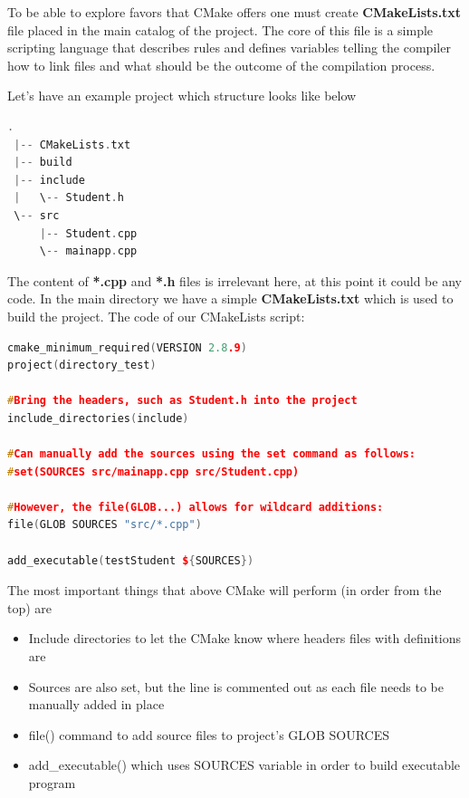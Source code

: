 \documentclass[a4paper,12pt]{article}
\begin{document}
{{\bigskip
To be able to explore favors that CMake offers one must create \textbf{CMakeLists.txt} file placed in the main catalog of the project. The core of this file is a simple scripting language that describes rules and defines variables telling the compiler how to link files and what should be the outcome of the compilation process.

\bigskip
Let's have an example project\cite{cmakeintroduction} which structure looks like below\newline
\begin{lstlisting}[frame=single, language=C++, caption={Example CMake project structure}, captionpos=b]
 .
 |-- CMakeLists.txt
 |-- build
 |-- include
 |   \-- Student.h
 \-- src
     |-- Student.cpp
     \-- mainapp.cpp
\end{lstlisting}

\bigskip
The content of \textbf{*.cpp} and \textbf{*.h} files is irrelevant here, at this point it could be any code. In the main directory we have a simple \textbf{CMakeLists.txt} which is used to build the project. The code of our CMakeLists script:\newline

\begin{lstlisting}[frame=single, language=C++, caption={CMakeLists.txt of example project}, captionpos=b]
cmake_minimum_required(VERSION 2.8.9)
project(directory_test)

#Bring the headers, such as Student.h into the project
include_directories(include)

#Can manually add the sources using the set command as follows:
#set(SOURCES src/mainapp.cpp src/Student.cpp)

#However, the file(GLOB...) allows for wildcard additions:
file(GLOB SOURCES "src/*.cpp")

add_executable(testStudent ${SOURCES})
\end{lstlisting}
\bigskip
The most important things that above CMake will perform (in order from the top) are
\begin{itemize}
	\item Include directories to let the CMake know where headers files with definitions are
	\item Sources are also set, but the line is commented out as each file needs to be manually added in place
	\item file() command to add source files to project's GLOB SOURCES
	\item add\_executable() which uses SOURCES variable in order to build executable program
\end{itemize}


}}
\end{document}
